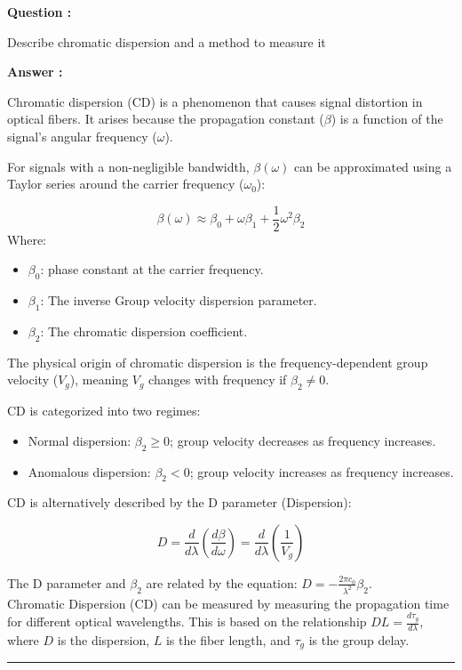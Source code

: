 \documentclass[a4paper,11pt]{book}
\newcounter{qacount}
\newenvironment{question}{
  \refstepcounter{qacount}
  \vspace{1em} %
  \noindent\textbf{Question \theqacount:}\space
}{
  \par %
}
\newenvironment{answer}{
  \noindent\textbf{Answer \theqacount:}\space
}{
  \par\vspace{1em}   %
  \hrule             %
  \vspace{0.5em}     %
}
\begin{document}
\begin{question}
    Describe chromatic dispersion and a method to measure it
\end{question}

\begin{answer}
    Chromatic dispersion (CD) is a phenomenon that causes signal distortion in optical fibers. It arises because the propagation constant ($\beta$) is a function of the signal's angular frequency ($\omega$).

    For signals with a non-negligible bandwidth, $\beta(\omega)$ can be approximated using a Taylor series around the carrier frequency ($\omega_0$):

    $$\beta(\omega) \approx \beta_0 + \omega\beta_1 + \frac{1}{2}\omega^2\beta_2$$
    Where:
    \begin{itemize}
        \item $\beta_0$: phase constant at the carrier frequency.
        \item $\beta_1$: The inverse Group velocity dispersion parameter.
        \item $\beta_2$: The chromatic dispersion coefficient.
    \end{itemize}

    The physical origin of chromatic dispersion is the frequency-dependent group velocity ($V_g$), meaning $V_g$ changes with frequency if $\beta_2 \neq 0$.

    CD is categorized into two regimes:
    \begin{itemize}
        \item Normal dispersion: $\beta_2 \geq 0$; group velocity decreases as frequency increases.
        \item Anomalous dispersion: $\beta_2 < 0$; group velocity increases as frequency increases.
    \end{itemize}
    CD is alternatively described by the D parameter (Dispersion):

    $$D = \frac{d}{d\lambda}\left(\frac{d\beta}{d\omega}\right) = \frac{d}{d\lambda}\left(\frac{1}{V_g}\right)$$

    The D parameter and $\beta_2$ are related by the equation: $D = -\frac{2\pi c_0}{\lambda^2}\beta_2$.\\
    Chromatic Dispersion (CD) can be measured by measuring the propagation time for different optical wavelengths. This is based on the relationship $D L = \frac{d\tau_g}{d\lambda}$, where $D$ is the dispersion, $L$ is the fiber length, and $\tau_g$ is the group delay.
\end{answer}
\end{document}
